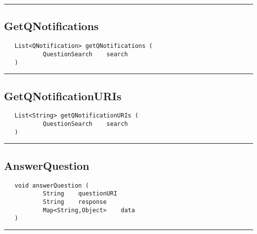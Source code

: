 \rule{15cm}{2pt}
\subsection{GetQNotifications}
\label{Api:GetQNotifications}
\begin{verbatim}
   List<QNotification> getQNotifications (
           QuestionSearch    search
   )
\end{verbatim}



\rule{15cm}{2pt}
\subsection{GetQNotificationURIs}
\label{Api:GetQNotificationURIs}
\begin{verbatim}
   List<String> getQNotificationURIs (
           QuestionSearch    search
   )
\end{verbatim}



\rule{15cm}{2pt}
\subsection{AnswerQuestion}
\label{Api:AnswerQuestion}
\begin{verbatim}
   void answerQuestion (
           String    questionURI
           String    response
           Map<String,Object>    data
   )
\end{verbatim}



\rule{15cm}{2pt}
